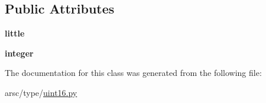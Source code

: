\subsection*{Public Attributes}
\begin{DoxyCompactItemize}
\item 
\mbox{\label{classarsc_1_1type_1_1uint16_1_1uint16_ab985d16eeb308016a4ae381965f8b30f}} 
{\bfseries little}
\item 
\mbox{\label{classarsc_1_1type_1_1uint16_1_1uint16_aa30eaf167237e1696177e0cf19cf0b65}} 
{\bfseries integer}
\end{DoxyCompactItemize}


The documentation for this class was generated from the following file\+:\begin{DoxyCompactItemize}
\item 
arsc/type/\mbox{\hyperlink{uint16_8py}{uint16.\+py}}\end{DoxyCompactItemize}

